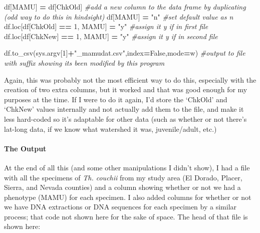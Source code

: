 \documentclass[
]{article}
\newenvironment{Shaded}{\begin{snugshade}}{\end{snugshade}}
\newcommand{\CommentTok}[1]{\textcolor[rgb]{0.56,0.35,0.01}{\textit{#1}}}
\newcommand{\DecValTok}[1]{\textcolor[rgb]{0.00,0.00,0.81}{#1}}
\newcommand{\NormalTok}[1]{#1}
\newcommand{\OperatorTok}[1]{\textcolor[rgb]{0.81,0.36,0.00}{\textbf{#1}}}
\newcommand{\StringTok}[1]{\textcolor[rgb]{0.31,0.60,0.02}{#1}}
\newcommand{\VariableTok}[1]{\textcolor[rgb]{0.00,0.00,0.00}{#1}}
\begin{document}
\begin{Shaded}
\begin{Highlighting}[]
\NormalTok{df[}\StringTok{\textquotesingle{}MAMU\textquotesingle{}}\NormalTok{] }\OperatorTok{=}\NormalTok{ df[}\StringTok{\textquotesingle{}ChkOld\textquotesingle{}}\NormalTok{] }\CommentTok{\#add a new column to the data frame by duplicating (odd way to do this in hindsight)}
\NormalTok{df[}\StringTok{\textquotesingle{}MAMU\textquotesingle{}}\NormalTok{] }\OperatorTok{=} \StringTok{"n"} \CommentTok{\#set default value as n}
\NormalTok{df.loc[df[}\StringTok{\textquotesingle{}ChkOld\textquotesingle{}}\NormalTok{] }\OperatorTok{==} \DecValTok{1}\NormalTok{, }\StringTok{\textquotesingle{}MAMU\textquotesingle{}}\NormalTok{] }\OperatorTok{=} \StringTok{"y"} \CommentTok{\#assign it y if in first file}
\NormalTok{df.loc[df[}\StringTok{\textquotesingle{}ChkNew\textquotesingle{}}\NormalTok{] }\OperatorTok{==} \DecValTok{1}\NormalTok{, }\StringTok{\textquotesingle{}MAMU\textquotesingle{}}\NormalTok{] }\OperatorTok{=} \StringTok{"y"} \CommentTok{\#assign it y if in second file}

\NormalTok{df.to\_csv(sys.argv[}\DecValTok{1}\NormalTok{]}\OperatorTok{+}\StringTok{"\_mamudat.csv"}\NormalTok{,index}\OperatorTok{=}\VariableTok{False}\NormalTok{,mode}\OperatorTok{=}\StringTok{\textquotesingle{}w\textquotesingle{}}\NormalTok{) }\CommentTok{\#output to file with suffix showing it\textquotesingle{}s been modified by this program}
\end{Highlighting}
\end{Shaded}

Again, this was probably not the most efficient way to do this,
especially with the creation of two extra columns, but it worked and
that was good enough for my purposes at the time. If I were to do it
again, I'd store the `ChkOld' and `ChkNew' values internally and not
actually add them to the file, and make it less hard-coded so it's
adaptable for other data (such as whether or not there's lat-long data,
if we know what watershed it was, juvenile/adult, etc.)

\hypertarget{the-output}{%
\paragraph{The Output}\label{the-output}}

At the end of all this (and some other manipulations I didn't show), I
had a file with all the specimens of \emph{Th. couchii} from my study
area (El Dorado, Placer, Sierra, and Nevada counties) and a column
showing whether or not we had a phenotype (MAMU) for each specimen. I
also added columns for whether or not we have DNA extractions or DNA
sequences for each specimen by a similar process; that code not shown
here for the sake of space. The head of that file is shown here:
\end{document}
